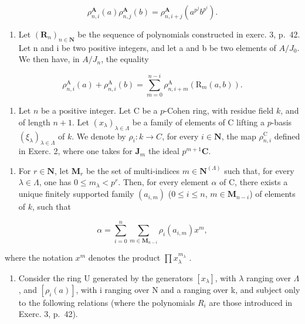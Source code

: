 \[
\rho_ {n, i} ^ {\mathbf {A}} (a) \rho_ {n, j} ^ {\mathbf {A}} (b) = \rho_ {n, i + j} ^ {\mathbf {A}} \left(a ^ {p ^ {j}} b ^ {p ^ {i}}\right).
\]

\begin{enumerate}
\def\labelenumi{\alph{enumi})}
\setcounter{enumi}{2}
\tightlist
\item
  Let \((\mathbf{R}_{n})_{n\in\mathbf{N}}\) be the sequence of polynomials constructed in exerc. 3, p.~42. Let n and i be two positive integers, and let a and b be two elements of \(A/J_{0}\). We then have, in \(A/J_{n}\), the equality
\end{enumerate}

\[
\rho_ {n, i} ^ {\mathrm{A}} (a) + \rho_ {n, i} ^ {\mathrm{A}} (b) = \sum_ {m = 0} ^ {n - i} \rho_ {n, i + m} ^ {\mathrm{A}} (\mathrm{R} _ {m} (a, b)).
\]

\begin{enumerate}
\def\labelenumi{\arabic{enumi})}
\setcounter{enumi}{2}
\tightlist
\item
  Let \(n\) be a positive integer. Let C be a \(p\)-Cohen ring, with residue field \(k\), and of length \(n+1\). Let \((x_{\lambda})_{\lambda\in\Lambda}\) be a family of elements of C lifting a \(p\)-basis \((\xi_{\lambda})_{\lambda\in\Lambda}\) of \(k\). We denote by \(\rho_{i}:k\to C\), for every \(i\in\mathbf{N}\), the map \(\rho_{n,i}^{\mathrm{C}}\) defined in Exerc. 2, where one takes for \(\mathbf{J}_{m}\) the ideal \(p^{m+1}\mathbf{C}\).
\end{enumerate}

\begin{enumerate}
\def\labelenumi{\alph{enumi})}
\tightlist
\item
  For \(r \in \mathbf{N}\), let \(\mathbf{M}_r\) be the set of multi-indices \(m \in \mathbf{N}^{(\Lambda)}\) such that, for every \(\lambda \in \Lambda\), one has \(0 \leqslant m_{\lambda} < p^{r}\). Then, for every element \(\alpha\) of C, there exists a unique finitely supported family \((a_{i,m})\) (\(0 \leqslant i \leqslant n\), \(m \in \mathbf{M}_{n-i}\)) of elements of \(k\), such that
\end{enumerate}

\[
\alpha = \sum_ {i = 0} ^ {n} \sum_ {m \in \mathbf {M} _ {n - i}} \rho_ {i} (a _ {i, m}) x ^ {m},
\]

where the notation \(x^{m}\) denotes the product \(\prod x_{\lambda}^{m_{\lambda}}\) .

\begin{enumerate}
\def\labelenumi{\alph{enumi})}
\setcounter{enumi}{1}
\tightlist
\item
  Consider the ring U generated by the generators \([x_{\lambda}]\), with \(\lambda\) ranging over \(\Lambda\), and \([\rho_{i}(a)]\), with i ranging over N and a ranging over k, and subject only to the following relations (where the polynomials \(R_{i}\) are those introduced in Exerc. 3, p.~42).
\end{enumerate}

